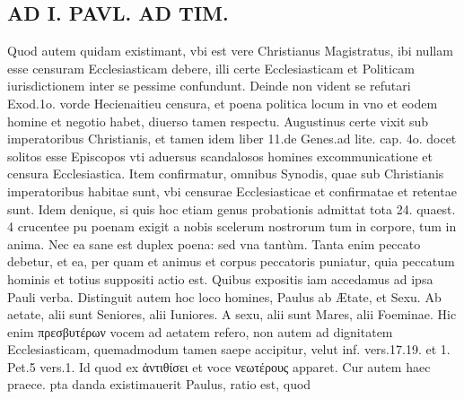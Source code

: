 \documentclass{article}
\begin{document}
\begin{pages}
\section*{AD I. PAVL. AD TIM. }
\marginpar{[ p.248 ]}\pstart Quod autem quidam existimant, vbi est vere Christianus Magistratus, ibi nullam esse censuram Ecclesiasticam debere, illi certe Ecclesiasticam et Politicam iurisdictionem inter se pessime confundunt. Deinde non vident se refutari Exod.1o. vorde Hecienaitieu censura, et poena politica locum in vno et eodem homine et negotio habet, diuerso tamen respectu.  \pend\pstart Augustinus certe vixit sub imperatoribus Christianis, et tamen idem liber 11.de Genes.ad lite. cap. 4o. docet solitos esse Episcopos vti aduersus scandalosos homines excommunicatione et censura Ecclesiastica. Item confirmatur, omnibus Synodis, quae sub Christianis imperatoribus habitae sunt, vbi censurae Ecclesiasticae et confirmatae et retentae sunt. Idem denique, si quis hoc etiam genus probationis admittat tota 24. quaest. 4 crucentee pu poenam exigit a nobis scelerum nostrorum tum in corpore, tum in anima. Nec ea sane est duplex poena: sed vna tantùm. Tanta enim peccato debetur, et ea, per quam et animus et corpus peccatoris puniatur, quia peccatum hominis et totius suppositi actio est.  \pend\pstart Quibus expositis iam accedamus ad ipsa Pauli verba. Distinguit autem hoc loco homines, Paulus ab Ætate, et Sexu. Ab aetate, alii sunt Seniores, alii Iuniores. A sexu, alii sunt Mares, alii Foeminae. Hic enim πρεσβυτέρων vocem ad aetatem refero, non autem ad dignitatem Ecclesiasticam, quemadmodum tamen saepe accipitur, velut inf. vers.17.19. et 1. Pet.5 vers.1. Id quod ex ἀντιθίσει et voce νεωτέρους apparet. Cur autem haec praece. pta danda existimauerit Paulus, ratio est, quod  \pend

\end{pages}
\end{document}
